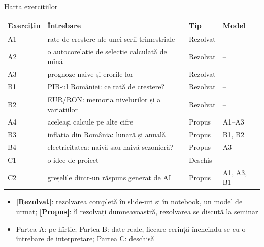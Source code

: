 \begin{frame}{Harta exercițiilor}
\itemsize{\footnotesize}
\begin{center}
\footnotesize
\begin{tabular}{l>{\raggedright\arraybackslash}p{6.4cm}ll}
\toprule
\textbf{Exercițiu} & \textbf{Întrebare} & \textbf{Tip} & \textbf{Model} \\
\midrule
A1 & rate de creștere ale unei serii trimestriale & Rezolvat & -- \\
A2 & o autocorelație de selecție calculată de mînă & Rezolvat & -- \\
A3 & prognoze naive și erorile lor & Rezolvat & -- \\
B1 & PIB-ul României: ce rată de creștere? & Rezolvat & -- \\
B2 & EUR/RON: memoria nivelurilor și a variațiilor & Rezolvat & -- \\
A4 & aceleași calcule pe alte cifre & Propus & A1--A3 \\
B3 & inflația din România: lunară și anuală & Propus & B1, B2 \\
B4 & electricitatea: naivă sau naivă sezonieră? & Propus & A3 \\
C1 & o idee de proiect & Deschis & -- \\
C2 & greșelile dintr-un răspuns generat de AI & Propus & A1, A3, B1 \\
\bottomrule
\end{tabular}
\end{center}
\begin{itemize}
    \item \textbf{[Rezolvat]}: rezolvarea completă în slide-uri și în notebook, un model de urmat; \textbf{[Propus]}: îl rezolvați dumneavoastră, rezolvarea se discută la seminar
    \item Partea A: pe hîrtie; Partea B: date reale, fiecare cerință încheindu-se cu o întrebare de interpretare; Partea C: deschisă
\end{itemize}
\end{frame}

